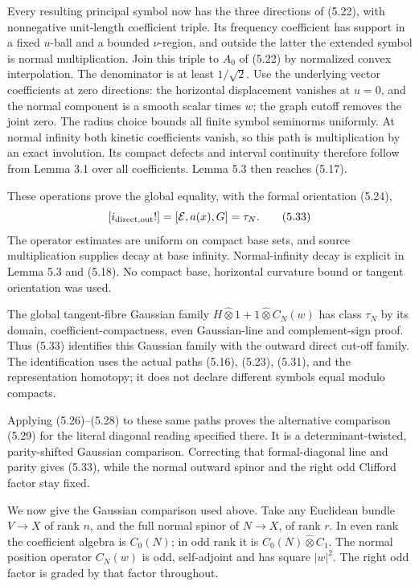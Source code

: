 \documentclass[
  11pt,
]{article}
\begin{document}
Every resulting principal symbol now has the three directions of (5.22),
with nonnegative unit-length coefficient triple. Its frequency
coefficient has support in a fixed \(u\)-ball and a bounded
\(\nu\)-region, and outside the latter the extended symbol is normal
multiplication. Join this triple to \(A_0\) of (5.22) by normalized
convex interpolation. The denominator is at least \(1/\sqrt2\). Use the
underlying vector coefficients at zero directions: the horizontal
displacement vanishes at \(u=0\), and the normal component is a smooth
scalar times \(w\); the graph cutoff removes the joint zero. The radius
choice bounds all finite symbol seminorms uniformly. At normal infinity
both kinetic coefficients vanish, so this path is multiplication by an
exact involution. Its compact defects and interval continuity therefore
follow from Lemma 3.1 over all coefficients. Lemma 5.3 then reaches
(5.17).

These operations prove the global equality, with the formal orientation
(5.24), \[
[i_{\rm direct,out}!]=[\mathcal E,a(x),G]=\tau_N.
\tag{5.33}
\] The operator estimates are uniform on compact base sets, and source
multiplication supplies decay at base infinity. Normal-infinity decay is
explicit in Lemma 5.3 and (5.18). No compact base, horizontal curvature
bound or tangent orientation was used.

The global tangent-fibre Gaussian family
\(H\widehat\otimes1+1\widehat\otimes C_N(w)\) has class \(\tau_N\) by
its domain, coefficient-compactness, even Gaussian-line and
complement-sign proof. Thus (5.33) identifies this Gaussian family with
the outward direct cut-off family. The identification uses the actual
paths (5.16), (5.23), (5.31), and the representation homotopy; it does
not declare different symbols equal modulo compacts.

Applying (5.26)--(5.28) to these same paths proves the alternative
comparison (5.29) for the literal diagonal reading specified there. It
is a determinant-twisted, parity-shifted Gaussian comparison. Correcting
that formal-diagonal line and parity gives (5.33), while the normal
outward spinor and the right odd Clifford factor stay fixed.

We now give the Gaussian comparison used above. Take any Euclidean
bundle \(V\to X\) of rank \(n\), and the full normal spinor of
\(N\to X\), of rank \(r\). In even rank the coefficient algebra is
\(C_0(N)\); in odd rank it is \(C_0(N)\widehat\otimes C_1\). The normal
position operator \(C_N(w)\) is odd, self-adjoint and has square
\(|w|^2\). The right odd factor is graded by that factor throughout.
\end{document}
